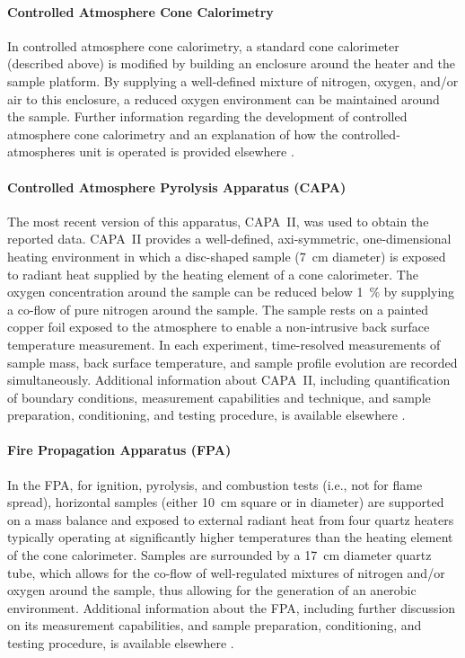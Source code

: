 \documentclass{book}
\begin{document}
\paragraph{Controlled Atmosphere Cone Calorimetry}

In controlled atmosphere cone calorimetry, a standard cone calorimeter (described above) is modified by building an enclosure around the heater and the sample platform. By supplying a well-defined mixture of nitrogen, oxygen, and/or air to this enclosure, a reduced oxygen environment can be maintained around the sample. Further information regarding the development of controlled atmosphere cone calorimetry and an explanation of how the controlled‐atmospheres unit is operated is provided elsewhere \cite{babrauskas1992cone}.

\paragraph{Controlled Atmosphere Pyrolysis Apparatus (CAPA)}

The most recent version of this apparatus, CAPA~II, was used to obtain the reported data. CAPA~II provides a well-defined, axi-symmetric, one-dimensional heating environment in which a disc-shaped sample (7~cm diameter) is exposed to radiant heat supplied by the heating element of a cone calorimeter. The oxygen concentration around the sample can be reduced below 1~\% by supplying a co-flow of pure nitrogen around the sample. The sample rests on a painted copper foil exposed to the atmosphere to enable a non-intrusive back surface temperature measurement. In each experiment, time-resolved measurements of sample mass, back surface temperature, and sample profile evolution are recorded simultaneously. Additional information about CAPA~II, including quantification of boundary conditions, measurement capabilities and technique, and sample preparation, conditioning, and testing procedure, is available elsewhere \cite{swann2017controlled}.

\paragraph{Fire Propagation Apparatus (FPA)}

In the FPA, for ignition, pyrolysis, and combustion tests (i.e., not for flame spread), horizontal samples (either 10~cm square or in diameter) are supported on a mass balance and exposed to external radiant heat from four quartz heaters typically operating at significantly higher temperatures than the heating element of the cone calorimeter. Samples are surrounded by a 17~cm diameter quartz tube, which allows for the co-flow of well-regulated mixtures of nitrogen and/or oxygen around the sample, thus allowing for the generation of an anerobic environment. Additional information about the FPA, including further discussion on its measurement capabilities, and sample preparation, conditioning, and testing procedure, is available elsewhere \cite{astm2058standard}.
\end{document}
